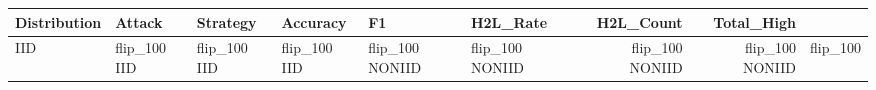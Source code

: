 \begin{tabular}{llllllrr}
\toprule
Distribution & Attack & Strategy & Accuracy & F1 & H2L_Rate & H2L_Count & Total_High \\
\midrule
IID & flip_100%
IID & flip_100%
IID & flip_100%
IID & flip_100%
NONIID & flip_100%
NONIID & flip_100%
NONIID & flip_100%
NONIID & flip_100%
\bottomrule
\end{tabular}
